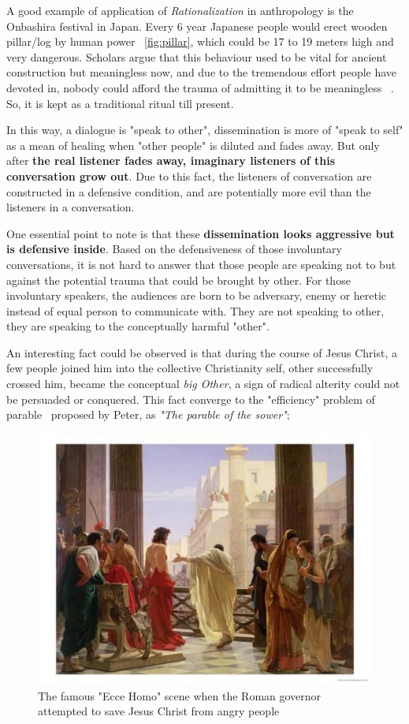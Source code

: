 \documentclass[]{article}
\begin{document}
A good example of application of \textit{Rationalization} in anthropology is the Onbashira festival in Japan. Every 6 year Japanese people would erect wooden pillar/log by human power ~\ref{fig:pillar}, which could be 17 to 19 meters high and very dangerous. Scholars argue that this behaviour used to be vital for ancient construction but meaningless now, and due to the tremendous effort people have devoted in, nobody could afford the trauma of admitting it to be meaningless ~\cite{csapo2005theories}. So, it is kept as a traditional ritual till present. 

In this way, a dialogue is "speak to other", dissemination is more of "speak to self" as a mean of healing when "other people" is diluted and fades away. But only after \textbf{the real listener fades away, imaginary listeners of this conversation grow out}. Due to this fact, the listeners of conversation are constructed in a defensive condition, and are potentially more evil than the listeners in a conversation.


One essential point to note is that these \textbf{dissemination looks aggressive but is defensive inside}. Based on the defensiveness of those involuntary conversations, it is not hard to answer that those people are speaking not to but against the potential trauma that could be brought by other. For those involuntary speakers, the audiences are born to be adversary, enemy or heretic instead of equal person to communicate with. They are not speaking to other, they are speaking to the conceptually harmful "other".

An interesting fact could be observed is that during the course of Jesus Christ, a few people joined him into the collective Christianity self, other successfully crossed him, became the conceptual \textit{big Other}, a sign of radical alterity could not be persuaded or conquered. This fact converge to the "efficiency" problem of parable~\cite{peters2012speaking} proposed by Peter, as \textit{"The parable of the sower"};

\begin{figure}
	\centering
	\includegraphics[width=0.8\linewidth]{ecce_homo}
	\caption{The famous "Ecce Homo" scene when the Roman governor attempted to save Jesus Christ from angry people}
	\label{fig:eccehomo}
\end{figure}
\end{document}
